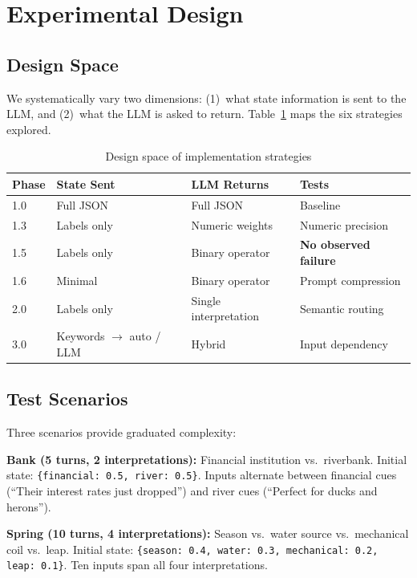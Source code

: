 \documentclass[11pt,a4paper]{article}
\begin{document}
\section{Experimental Design}
\label{sec:design}

\subsection{Design Space}

We systematically vary two dimensions: (1)~what state information is sent to the LLM,
and (2)~what the LLM is asked to return. Table~\ref{tab:design_space} maps the six
strategies explored.

\begin{table}[ht]
\centering
\begin{tabular}{llll}
\toprule
\textbf{Phase} & \textbf{State Sent} & \textbf{LLM Returns} & \textbf{Tests} \\
\midrule
1.0 & Full JSON & Full JSON & Baseline \\
1.3 & Labels only & Numeric weights & Numeric precision \\
1.5 & Labels only & Binary operator & \textbf{No observed failure} \\
1.6 & Minimal & Binary operator & Prompt compression \\
2.0 & Labels only & Single interpretation & Semantic routing \\
3.0 & Keywords $\to$ auto / LLM & Hybrid & Input dependency \\
\bottomrule
\end{tabular}
\caption{Design space of implementation strategies}
\label{tab:design_space}
\end{table}

\subsection{Test Scenarios}

Three scenarios provide graduated complexity:

\textbf{Bank (5 turns, 2 interpretations):}
Financial institution vs.\ riverbank. Initial state:
\texttt{\{financial: 0.5, river: 0.5\}}. Inputs alternate between financial cues
(``Their interest rates just dropped'') and river cues (``Perfect for ducks and herons'').

\textbf{Spring (10 turns, 4 interpretations):}
Season vs.\ water source vs.\ mechanical coil vs.\ leap. Initial state:
\texttt{\{season: 0.4, water: 0.3, mechanical: 0.2, leap: 0.1\}}. Ten inputs
span all four interpretations.
\end{document}
